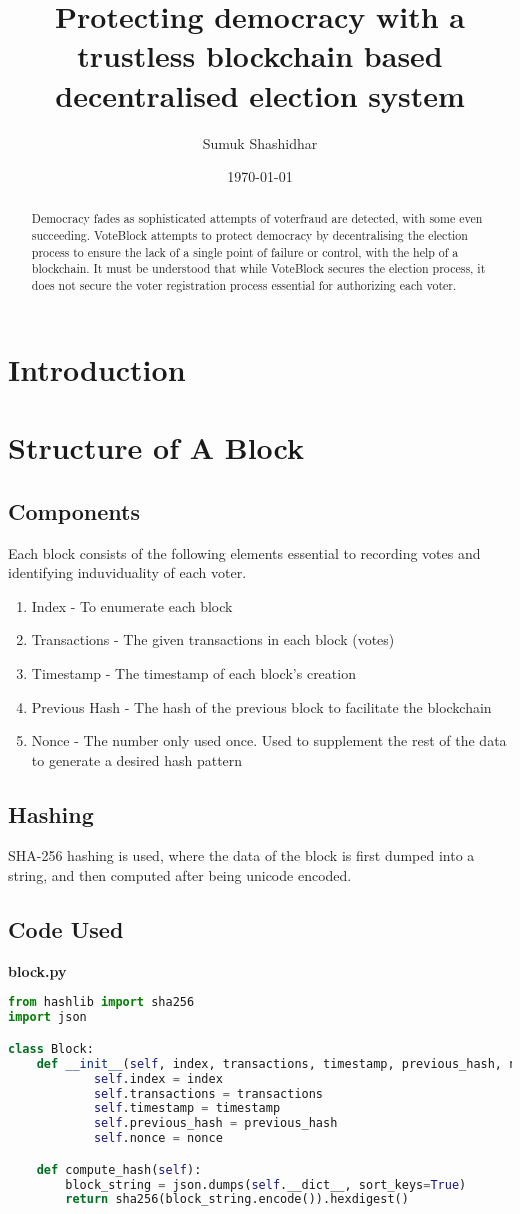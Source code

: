 \documentclass{article}
\title{Protecting democracy with a trustless blockchain based decentralised election system}
\author{Sumuk Shashidhar}
\date{\today}
\begin{document}
	\maketitle
	\begin{abstract}
		Democracy fades as sophisticated attempts of voterfraud are detected, with some even succeeding. VoteBlock attempts to protect democracy by decentralising the election process to ensure the lack of a single point of failure or control, with the help of a blockchain. It must be understood that while VoteBlock secures the election process, it does not secure the voter registration process essential for authorizing each voter. 
	\end{abstract}
	\pagebreak
	\tableofcontents
	\pagebreak
	\section{Introduction}
	\section{Structure of A Block}
	\subsection{Components}
	Each block consists of the following elements essential to recording votes and identifying induviduality of each voter.
	\begin{enumerate}
		\item Index - To enumerate each block
		\item Transactions - The given transactions in each block (votes)
		\item Timestamp - The timestamp of each block's creation
		\item Previous Hash - The hash of the previous block to facilitate the blockchain
		\item Nonce - The number only used once. Used to supplement the rest of the data to generate a desired hash pattern
	\end{enumerate}
	\subsection{Hashing}
	SHA-256 hashing is used, where the data of the block is first dumped into a string, and then computed after being unicode encoded.
	\subsection{Code Used}
	\textbf{block.py}
	\begin{lstlisting}[language=Python]
from hashlib import sha256
import json

class Block:
	def __init__(self, index, transactions, timestamp, previous_hash, nonce=0):
			self.index = index
			self.transactions = transactions
			self.timestamp = timestamp
			self.previous_hash = previous_hash
			self.nonce = nonce

	def compute_hash(self):
		block_string = json.dumps(self.__dict__, sort_keys=True)
		return sha256(block_string.encode()).hexdigest()
	\end{lstlisting}
	
\end{document}
